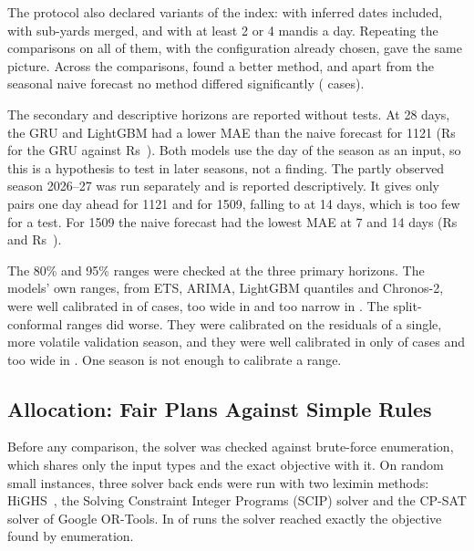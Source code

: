 The protocol also declared  variants of the index: with inferred dates included, with sub-yards merged, and with at
least 2 or 4 mandis a day. Repeating the comparisons on all of them, with the configuration already chosen, gave the same picture.
Across the  comparisons,  found a better method, and apart from the seasonal naive forecast no
method differed significantly ( cases).

The secondary and descriptive horizons are reported without tests. At 28 days, the GRU and LightGBM had a lower MAE than the naive
forecast for 1121 (Rs~ for the GRU against Rs~). Both models use the day of the season
as an input, so this is a hypothesis to test in later seasons, not a finding. The partly observed season 2026--27 was run separately
and is reported descriptively. It gives only  pairs one day ahead for 1121 and  for 1509,
falling to  at 14 days, which is too few for a test. For 1509 the naive forecast had the lowest MAE at 7 and 14
days (Rs~ and Rs~).

The 80\% and 95\% ranges were checked at the three primary horizons. The models' own ranges, from ETS, ARIMA, LightGBM quantiles and
Chronos-2, were well calibrated in  of  cases, too wide in  and too
narrow in . The split-conformal ranges did worse. They were calibrated on the residuals of a single, more volatile
validation season, and they were well calibrated in only  of
 cases and too wide in . One season is not enough to calibrate a range.

\subsection{Allocation: Fair Plans Against Simple Rules}
\label{sec:results-alloc}

Before any comparison, the solver was checked against brute-force enumeration, which shares only the input types and the exact
objective with it. On  random small instances, three solver back ends were run with two leximin methods:
HiGHS~\cite{highs}, the Solving Constraint Integer Programs (SCIP) solver and the CP-SAT solver of Google OR-Tools. In
 of  runs the solver reached exactly the objective found by enumeration.

